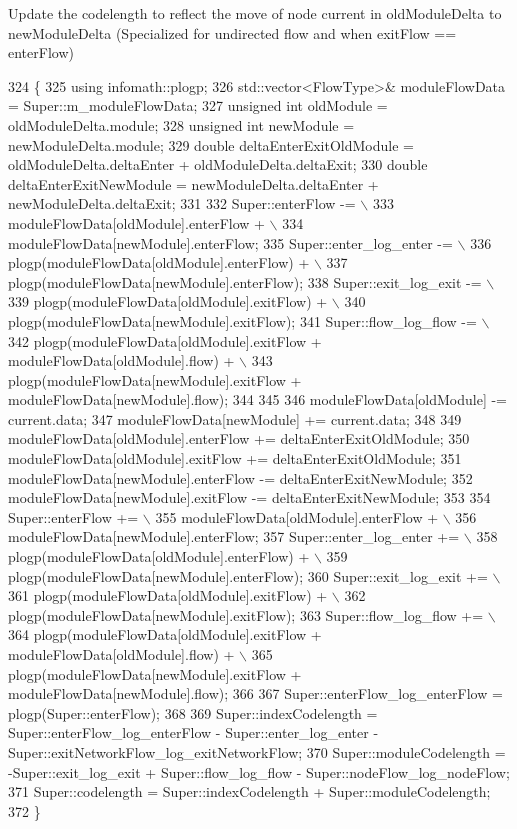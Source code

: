 Update the codelength to reflect the move of node current in old\+Module\+Delta to new\+Module\+Delta (Specialized for undirected flow and when exit\+Flow == enter\+Flow) 
\begin{DoxyCode}
324 \{
325     \textcolor{keyword}{using} infomath::plogp;
326     std::vector<FlowType>& moduleFlowData = Super::m\_moduleFlowData;
327     \textcolor{keywordtype}{unsigned} \textcolor{keywordtype}{int} oldModule = oldModuleDelta.module;
328     \textcolor{keywordtype}{unsigned} \textcolor{keywordtype}{int} newModule = newModuleDelta.module;
329     \textcolor{keywordtype}{double} deltaEnterExitOldModule = oldModuleDelta.deltaEnter + oldModuleDelta.deltaExit;
330     \textcolor{keywordtype}{double} deltaEnterExitNewModule = newModuleDelta.deltaEnter + newModuleDelta.deltaExit;
331 
332     Super::enterFlow -= \(\backslash\)
333             moduleFlowData[oldModule].enterFlow + \(\backslash\)
334             moduleFlowData[newModule].enterFlow;
335     Super::enter\_log\_enter -= \(\backslash\)
336             plogp(moduleFlowData[oldModule].enterFlow) + \(\backslash\)
337             plogp(moduleFlowData[newModule].enterFlow);
338     Super::exit\_log\_exit -= \(\backslash\)
339             plogp(moduleFlowData[oldModule].exitFlow) + \(\backslash\)
340             plogp(moduleFlowData[newModule].exitFlow);
341     Super::flow\_log\_flow -= \(\backslash\)
342             plogp(moduleFlowData[oldModule].exitFlow + moduleFlowData[oldModule].flow) + \(\backslash\)
343             plogp(moduleFlowData[newModule].exitFlow + moduleFlowData[newModule].flow);
344 
345 
346     moduleFlowData[oldModule] -= current.data;
347     moduleFlowData[newModule] += current.data;
348 
349     moduleFlowData[oldModule].enterFlow += deltaEnterExitOldModule;
350     moduleFlowData[oldModule].exitFlow += deltaEnterExitOldModule;
351     moduleFlowData[newModule].enterFlow -= deltaEnterExitNewModule;
352     moduleFlowData[newModule].exitFlow -= deltaEnterExitNewModule;
353 
354     Super::enterFlow += \(\backslash\)
355             moduleFlowData[oldModule].enterFlow + \(\backslash\)
356             moduleFlowData[newModule].enterFlow;
357     Super::enter\_log\_enter += \(\backslash\)
358             plogp(moduleFlowData[oldModule].enterFlow) + \(\backslash\)
359             plogp(moduleFlowData[newModule].enterFlow);
360     Super::exit\_log\_exit += \(\backslash\)
361             plogp(moduleFlowData[oldModule].exitFlow) + \(\backslash\)
362             plogp(moduleFlowData[newModule].exitFlow);
363     Super::flow\_log\_flow += \(\backslash\)
364             plogp(moduleFlowData[oldModule].exitFlow + moduleFlowData[oldModule].flow) + \(\backslash\)
365             plogp(moduleFlowData[newModule].exitFlow + moduleFlowData[newModule].flow);
366 
367     Super::enterFlow\_log\_enterFlow = plogp(Super::enterFlow);
368 
369     Super::indexCodelength = Super::enterFlow\_log\_enterFlow - Super::enter\_log\_enter - 
      Super::exitNetworkFlow\_log\_exitNetworkFlow;
370     Super::moduleCodelength = -Super::exit\_log\_exit + Super::flow\_log\_flow - Super::nodeFlow\_log\_nodeFlow;
371     Super::codelength = Super::indexCodelength + Super::moduleCodelength;
372 \}
\end{DoxyCode}


